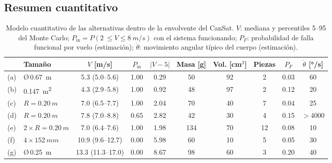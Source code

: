 \subsection{Resumen cuantitativo}
\begin{table}[H]
\centering\small
\caption{Modelo cuantitativo de las alternativas dentro de la envolvente del CanSat.
$V$: mediana y percentiles 5--95 del Monte Carlo; $P_{\mathrm{in}}=P(\SI{2}{}\le V\le
\SI{8}{m/s})$ con el sistema funcionando; $P_F$: probabilidad de falla funcional por
vuelo (estimación); $\dot\theta$: movimiento angular típico del cuerpo (estimación).}
\label{tab:decision-cuant}
\setlength{\tabcolsep}{3.5pt}
\begin{tabular}{@{}llcccccccc@{}}
\toprule
 & \textbf{Tamaño} & \textbf{$V$} [m/s] & \textbf{$P_{\mathrm{in}}$} & \textbf{$|V-5|$} &
 \textbf{Masa} [g] & \textbf{Vol.} [cm$^3$] & \textbf{Piezas} & \textbf{$P_F$} & \textbf{$\dot\theta$} [°/s]\\\midrule
(a) & Ø\,\SI{0.67}{m} & \num{5.3} (\num{5.0}--\num{5.6}) & \num{1.00} & \num{0.29} & 50 & 92 & 2 & \num{0.03} & 60\\
(b) & \SI{0.147}{m^2} & \num{4.3} (\num{2.9}--\num{5.8}) & \num{1.00} & \num{0.92} & 48 & 97 & 2 & \num{0.12} & 20\\
(c) & $R=\SI{0.20}{m}$ & \num{7.0} (\num{6.5}--\num{7.7}) & \num{1.00} & \num{2.04} & 70 & 40 & 7 & \num{0.04} & 25\\
(d) & $R=\SI{0.20}{m}$ & \num{7.8} (\num{7.0}--\num{8.8}) & \num{0.65} & \num{2.82} & 42 & 30 & 4 & \num{0.15} & $>\num{4000}$\\
(e) & $2\times R=\SI{0.20}{m}$ & \num{7.0} (\num{6.4}--\num{7.6}) & \num{1.00} & \num{1.98} & 134 & 70 & 12 & \num{0.08} & 10\\
(f) & $4\times\SI{152}{mm}$ & \num{10.9} (\num{9.6}--\num{12.7}) & \num{0.00} & \num{5.98} & 60 & 10 & 5 & \num{0.05} & 30\\
(g) & Ø\,\SI{0.25}{m} & \num{13.3} (\num{11.3}--\num{17.0}) & \num{0.00} & \num{8.67} & 98 & 60 & 3 & \num{0.20} & 40\\
\bottomrule
\end{tabular}
\end{table}

